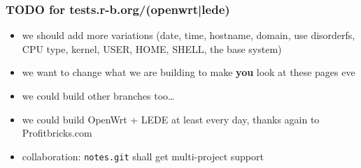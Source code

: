 \documentclass[14pt,aspectratio=169]{beamer}
\begin{document}
\begin{frame}
 \frametitle{TODO for tests.r-b.org/(openwrt|lede)}
 \begin{itemize}
  \item we should add more variations (date, time, hostname, domain, use disorderfs, CPU type,
  kernel, USER, HOME, SHELL, the base system)
  \item<2-3> we want to change what we are building to make \textbf{you} look at these
  pages eve
  \item<2-3> we could build other branches too…
  \item<2-3> we could build OpenWrt + LEDE at least every day, thanks again to
  Profitbricks.com
  \item<3> collaboration: \texttt{notes.git} shall get multi-project support
 \end{itemize}
\end{frame}
\end{document}
